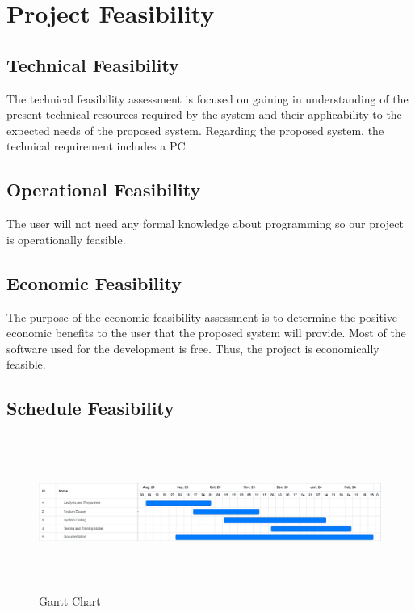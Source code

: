 \section{Project Feasibility}
\vspace{-18pt}
\subsection{Technical Feasibility}
\vspace{-18pt}
The technical feasibility assessment is focused on gaining in understanding of the present technical resources required by the system and their applicability to the expected needs of the proposed system. Regarding the proposed system, the technical requirement includes a PC.
\vspace{-18pt}
\subsection{Operational Feasibility}
\vspace{-18pt}
The user will not need any formal knowledge about programming so our project is operationally feasible.
\vspace{-18pt}
\subsection{Economic Feasibility}
\vspace{-18pt}
The purpose of the economic feasibility assessment is to determine the positive economic benefits to the user that the proposed system will provide. Most of the software used for the development is free. Thus, the project is economically feasible.
\vspace{-18pt}
\subsection{Schedule Feasibility}
\begin{figure}[!h] %
\begin{center}
	\includegraphics[width=6in,height=2in
	]{images/gn.png} 
	\caption{Gantt Chart} %
	\label{figGanttChart} %
\end{center}
\end{figure}

